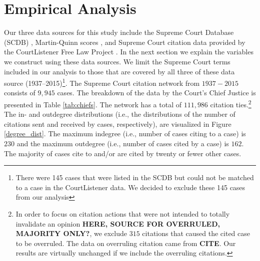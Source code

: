 \documentclass[headsepline=true, abstracton]{scrartcl}
\begin{document}
 \section{Empirical Analysis}
Our three data sources for this study include the Supreme Court Database (SCDB) \citep{spaeth2014supreme}, Martin-Quinn scores \citep{martin2002dynamic}, and Supreme Court citation data provided by the CourtListener Free Law Project \citep{CourtListener}. In the next section we explain the variables we construct using these data sources. We limit the Supreme Court terms included in our analysis to those that are covered by all three of these data source (1937--2015)\footnote{There were 145 cases that were listed in the SCDB but could not be matched to a case in the CourtListener data. We decided to exclude these 145 cases from our analysis}. The Supreme Court citation network from $1937 - 2015$ consists of $9,945$ cases. The breakdown of the data by the Court's Chief Justice is presented in Table \ref{tab:chiefs}. The network has a total of $111,986$ citation ties.\footnote{In order to focus on citation actions that were not intended to totally invalidate an opinion \textbf{ HERE, SOURCE FOR OVERRULED, MAJORITY ONLY?}, we exclude $315$ citations that caused the cited case to be overruled. The data on overruling citation came from \textbf{CITE}. Our results are virtually unchanged if we include the overruling citations.} The in- and outdegree distributions (i.e., the distributions of the number of citations sent and received by cases, respectively), are visualized in Figure \ref{degree_dist}. The maximum indegree (i.e., number of cases citing to a case) is $230$ and the maximum outdegree (i.e., number of cases cited by a case) is $162$. The majority of cases cite to and/or are cited by twenty or fewer other cases.
\end{document}
